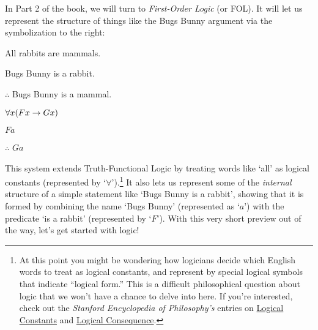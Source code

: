In Part 2 of the book, we will turn to \emph{First-Order Logic} (or FOL).  It will let us represent the structure of things like the Bugs Bunny argument via the symbolization to the right:


\begin{multicols}{2}

\begin{earg}
\item[\eref{exarg1}]All rabbits are mammals.
\item[] Bugs Bunny is a rabbit.
\item[] $\therefore$ Bugs Bunny is a mammal.
\end{earg}

\columnbreak

	\begin{earg}
		\item[] $\forall x(Fx \rightarrow Gx)$
		\item[] $Fa$
		\item[] $\therefore$ $Ga$
	\end{earg}

\end{multicols}

\noindent This system extends Truth-Functional Logic by treating words like `all' as logical constants (represented by `$\forall$').\footnote{At this point you might be wondering how logicians decide which English words to treat as logical constants, and represent by special logical symbols that indicate ``logical form.''  This is a difficult philosophical question about logic that we won't have a chance to delve into here.  If you're interested, check out the \emph{Stanford Encyclopedia of Philosophy's} entries on \href{http://plato.stanford.edu/entries/logical-constants/}{Logical Constants} and  \href{http://plato.stanford.edu/entries/logical-consequence/}{Logical Consequence}.}  It also lets us represent some of the \emph{internal} structure of a simple statement like `Bugs Bunny is a rabbit', showing that it is formed by combining the name `Bugs Bunny' (represented as `$a$') with the predicate `is a rabbit' (represented by `$F$'). With this very short preview out of the way, let's get started with logic! 




